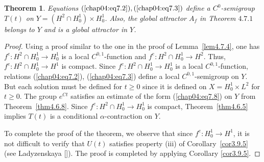 \documentclass{surv-l}
\theoremstyle{plain}
\newtheorem{theorem}{Theorem}[section]
\theoremstyle{definition}
\numberwithin{equation}{section}
\numberwithin{figure}{chapter}
\begin{document}
\begin{theorem}\label{thm4.7.5} Equations $(\ref{chap04:eq7.2}), (\ref{chap04:eq7.3})$ define a $C^{0}$-semigroup $T(t)$ on $Y= (H^{2}\cap H_{0}^{1})\times H_{0}^{1}$. Also, the global attractor $A_{f}$ in Theorem $4.7.1$ belongs to $Y$ and is a global attractor in $Y$.
\end{theorem}

\begin{proof}
Using a proof similar to the one in the proof of Lemma~\ref{lem4.7.4}, one has $f^{e}\!:H^{2}\cap H_{0}^{1}\rightarrow H_{0}^{1}$ is a local $C^{0,1}$-function and $f^{e}\!:H^{2}\cap H_{0}^{1}\rightarrow H^{2}.$ Thus, $f^{e}:H^{2}\cap H_{0}^{1}\rightarrow H^{1}$ is compact. Since $f^{e}\!:H^{2}\cap H_{0}^{1}\rightarrow H_{0}^{1}$ is a local $C^{0,1}$-function, relations (\ref{chap04:eq7.2}), (\ref{chap04:eq7.3}) define a local $C^{0,1}$-semigroup on $Y$. But each solution must be defined for $t\geq 0$ since it is defined on $X=H_{0}^{1}\times L^{2}$ for $t\geq 0$. The group $e^{Ct}$ satisfies an estimate of the form (\ref{chap04:eq7.8}) on $Y$ from Theorem~\ref{thm4.6.8}. Since $f^{e}\!:H^{2}\cap H_{0}^{1}\rightarrow H_{0}^{1}$ is compact, Theorem~\ref{thm4.6.5} implies $T(t)$ is a conditional $\alpha$-contraction on $Y$.

To complete the proof of the theorem, we observe that since $f^{e}\!:H_{0}^{1}\rightarrow H^{1}$, it is not difficult to verify that $U(t)$ satisfies property (iii) of Corollary~\ref{cor3.9.5} (see Ladyzenskaya [\citeyear{1985l}]). The proof is completed by applying Corollary \ref{cor3.9.5}.
\end{proof}
\end{document}
